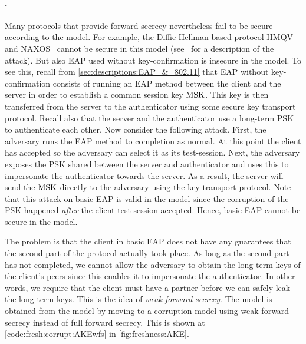 \paragraph{\texorpdfstring{\akewfstext}{AKEwfs}.} 
Many protocols that provide forward secrecy nevertheless fail to be secure according to the \akefstext model.
For example, the Diffie-Hellman based protocol HMQV~\cite{C:Krawczyk05} and NAXOS~\cite{PROVSEC:LaMLauMit07}
cannot be secure in this model
(see~\cite[§3.2]{EPRINT:Krawczyk05} for a description of the attack). 
But also EAP used without key-confirmation is insecure in the \akefstext model.
To see this,
recall from \cref{sec:descriptions:EAP_&_802.11} that EAP without key-confirmation consists of running an EAP method between the client and the server in order to establish a common session key $\mathrm{MSK}$.
This key is then transferred from the server to the authenticator using some secure key transport protocol. 
Recall also that the server and the authenticator use a long-term PSK to authenticate each other.
Now consider the following attack.
First, the adversary runs the EAP method to completion as normal.
At this point the client has accepted so the adversary can select it as its test-session.
Next, the adversary exposes the PSK shared between the server and authenticator and uses this to impersonate the authenticator towards the server.
As a result,
the server will send the $\mathrm{MSK}$ directly to the adversary using the key transport protocol.
Note that this attack on basic EAP is valid in the \akefstext model since the corruption of the PSK happened \emph{after} the client test-session accepted. 
Hence, basic EAP cannot be secure in the \akefstext model. 

The problem is that the client in basic EAP does not have any guarantees that the second part of the protocol actually took place.
As long as the second part has not completed,
we cannot allow the adversary to obtain the long-term keys of the client's peers since this enables it to impersonate the authenticator.
In other words,
we require that the client must have a partner before we can safely leak the long-term keys.
This is the idea of \emph{weak forward secrecy}.
The \akewfstext model is obtained from the \akefstext model by moving to a corruption model using weak forward secrecy instead of full forward secrecy.
This is shown at \cref{code:fresh:corrupt:AKEwfs} in \cref{fig:freshness:AKE}.


